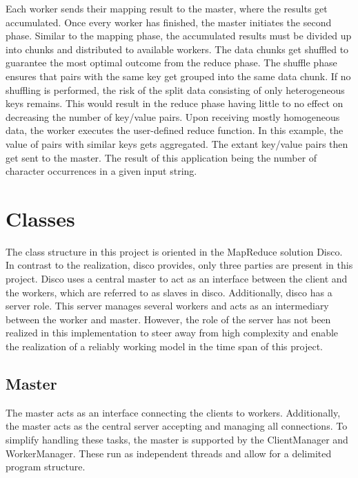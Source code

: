 \documentclass[12pt, letterpaper]{article}
\begin{document}
Each worker sends their mapping result to the master, where the results get accumulated. Once every worker has finished, the master initiates the second phase. Similar to the mapping phase, the accumulated results must be divided up into chunks and distributed to available workers. The data chunks get shuffled to guarantee the most optimal outcome from the reduce phase. The shuffle phase ensures that pairs with the same key get grouped into the same data chunk. If no shuffling is performed, the risk of the split data consisting of only heterogeneous keys remains. This would result in the reduce phase having little to no effect on decreasing the number of key/value pairs.\newline
Upon receiving mostly homogeneous data, the worker executes the user-defined reduce function. In this example, the value of pairs with similar keys gets aggregated. The extant key/value pairs then get sent to the master.\newline
The result of this application being the number of character occurrences in a given input string.

\pagebreak
\section{Classes}

The class structure in this project is oriented in the MapReduce solution Disco. In contrast to the realization, disco provides, only three parties are present in this project. Disco uses a central master to act as an interface between the client and the workers, which are referred to as slaves in disco. Additionally, disco has a server role. This server manages several workers and acts as an intermediary between the worker and master. However, the role of the server has not been realized in this implementation to steer away from high complexity and enable the realization of a reliably working model in the time span of this project.

\subsection{Master}

The master acts as an interface connecting the clients to workers. Additionally, the master acts as the central server accepting and managing all connections. To simplify handling these tasks, the master is supported by the ClientManager and WorkerManager. These run as independent threads and allow for a delimited program structure.
\end{document}
